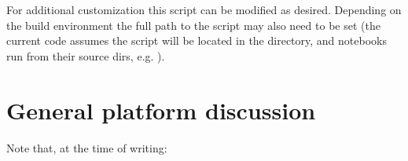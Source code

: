 \documentclass[letterpaper,table,10pt,english]{jupyterBook}
\begin{document}
\sphinxAtStartPar
For additional customization this script can be modified as desired. Depending on the build environment the full path to the script may also need to be set (the current code assumes the script will be located in the  directory, and notebooks run from their source dirs, e.g. ).


\section{General platform discussion}
\label{\detokenize{part1/platform_intro_070723:general-platform-discussion}}\label{\detokenize{part1/platform_intro_070723:sect-platform-general}}
\sphinxAtStartPar
Note that, at the time of writing:
\end{document}
